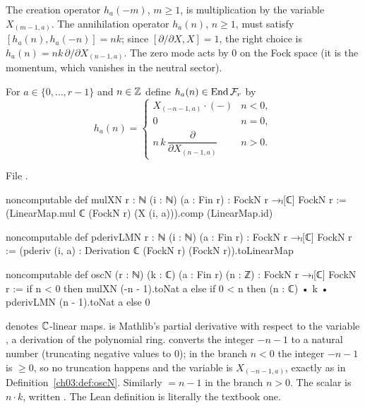 The creation operator $h_a(-m)$, $m\ge1$, is multiplication by the variable $X_{(m-1,a)}$. The
annihilation operator $h_a(n)$, $n\ge 1$, must satisfy $[h_a(n),h_a(-n)]=nk$; since
$[\partial/\partial X,X]=1$, the right choice is $h_a(n)=nk\,\partial/\partial X_{(n-1,a)}$. The
zero mode acts by $0$ on the Fock space (it is the momentum, which vanishes in the neutral sector).

\begin{definition}[Oscillators]\label{ch03:def:oscN}
For $a\in\{0,\dots,r-1\}$ and $n\in{\mathbb{Z}}$ define $h_a(n)\in\operatorname{End}\mathcal F_r$ by
\begin{equation*}
  h_a(n)=\begin{cases} X_{(-n-1,a)}\cdot(-) & n<0,\\ 0 & n=0,\\
  n\,k\,\dfrac{\partial}{\partial X_{(n-1,a)}} & n>0.\end{cases}
\end{equation*}
\end{definition}

\noindent File .
\begin{leancode}
noncomputable def mulXN {r : ℕ} (i : ℕ) (a : Fin r) : FockN r →ₗ[ℂ] FockN r :=
  (LinearMap.mul ℂ (FockN r) (X (i, a))).comp (LinearMap.id)

noncomputable def pderivLMN {r : ℕ} (i : ℕ) (a : Fin r) : FockN r →ₗ[ℂ] FockN r :=
  (pderiv (i, a) : Derivation ℂ (FockN r) (FockN r)).toLinearMap

noncomputable def oscN (r : ℕ) (k : ℂ) (a : Fin r) (n : ℤ) : FockN r →ₗ[ℂ] FockN r :=
  if n < 0 then mulXN (-n - 1).toNat a
  else if 0 < n then (n : ℂ) • k • pderivLMN (n - 1).toNat a
  else 0
\end{leancode}

\begin{dictionary}
 denotes ${\mathbb{C}}$-linear maps.  is Mathlib's partial derivative with
respect to the variable , a derivation of the polynomial ring. 
converts the integer $-n-1$ to a natural number (truncating negative values to $0$); in the branch
$n<0$ the integer $-n-1$ is $\ge 0$, so no truncation happens and the variable is $X_{(-n-1,a)}$,
exactly as in Definition~\ref{ch03:def:oscN}. Similarly  $=n-1$ in the branch
$n>0$. The scalar is $n\cdot k$, written . The Lean definition is
literally the textbook one.
\end{dictionary}

